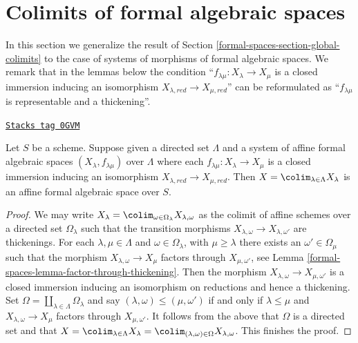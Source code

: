 \section{Colimits of formal algebraic spaces}
\label{formal-spaces-section-colimits-of-formal}
In this section we generalize the result of
Section \ref{formal-spaces-section-global-colimits}
to the case of systems of morphisms of formal algebraic spaces.
We remark that in the lemmas below the condition
``$f_{\lambda \mu} : X_\lambda \to X_\mu$ is a closed immersion
inducing an isomorphism $X_{\lambda, red} \to X_{\mu, red}$''
can be reformulated as
``$f_{\lambda \mu}$ is representable and a thickening''.

\begin{lemma}
\label{formal-spaces-lemma-colimit-affine-formal}
\href{https://stacks.math.columbia.edu/tag/0GVM}{\texttt{Stacks tag 0GVM}}

Let $S$ be a scheme. Suppose given a directed set
$\Lambda$ and a system of affine formal algebraic spaces
$(X_\lambda, f_{\lambda \mu})$ over $\Lambda$ where each
$f_{\lambda \mu} : X_\lambda \to X_\mu$ is a closed immersion
inducing an isomorphism $X_{\lambda, red} \to X_{\mu, red}$.
Then $X = \colim_{\lambda \in \Lambda} X_\lambda$
is an affine formal algebraic space over $S$.
\end{lemma}

\begin{proof}
We may write
$X_\lambda = \colim_{\omega \in \Omega_\lambda} X_{\lambda, \omega}$
as the colimit of affine schemes over a directed set
$\Omega_\lambda$ such that the transition morphisms
$X_{\lambda, \omega} \to X_{\lambda, \omega'}$
are thickenings. For each $\lambda, \mu \in \Lambda$
and $\omega \in \Omega_\lambda$, with $\mu \geq \lambda$
there exists an $\omega' \in \Omega_\mu$ such that the morphism
$X_{\lambda, \omega} \to X_\mu$ factors through $X_{\mu, \omega'}$, see
Lemma \ref{formal-spaces-lemma-factor-through-thickening}. Then
the morphism $X_{\lambda, \omega} \to X_{\mu, \omega'}$
is a closed immersion inducing an isomorphism on reductions
and hence a thickening. Set
$\Omega = \coprod_{\lambda \in \Lambda} \Omega_\lambda$
and say $(\lambda, \omega) \leq (\mu, \omega')$ if and only if
$\lambda \leq \mu$ and $X_{\lambda, \omega} \to X_\mu$ factors through
$X_{\mu, \omega'}$. It follows from the above that
$\Omega$ is a directed set and that
$X = \colim_{\lambda \in \Lambda} X_\lambda =
\colim_{(\lambda, \omega) \in \Omega} X_{\lambda, \omega}$.
This finishes the proof.
\end{proof}

